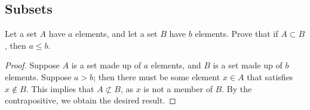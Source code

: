 \subsection{Subsets}%
				\begin{majorEx}%
					Let a set $ A $ have $a$ elements, and let a set $B$ have $b$ elements. Prove that if $A \subset B $, then $a\leq b$.
				\end{majorEx}
				\begin{proof}
					Suppose  $ A $ is a set made up of $a$ elements, and $B$ is a set made up of $b$ elements. Suppose $a > b$; then there must be some element $x \in A$ that satisfies $x \notin B$. This implies that $A \not\subset B$, as $x$ is not a member of $B$. By the contrapositive, we obtain the desired result.
				\end{proof}
